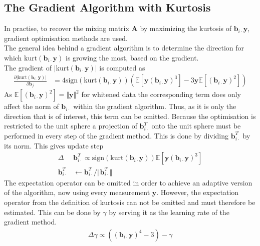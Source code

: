 \subsection{The Gradient Algorithm with Kurtosis}\label{sec:gra_kur}
In practise, to recover the mixing matrix $\textbf{A}$ by maximizing the kurtosis of $\textbf{b}_{i \cdot} \textbf{y}$, gradient optimisation methods are used.
\\
The general idea behind a gradient algorithm is to determine the direction for which $\text{kurt}(\textbf{b}_{i \cdot} \textbf{y})$ is growing the most, based on the gradient. 
\\
The gradient of $\vert \text{kurt}(\textbf{b}_{i \cdot} \textbf{y}) \vert$ is computed as
\begin{align}\label{eq:kurt}
\frac{\partial \vert \text{kurt}(\textbf{b}_{i \cdot} \textbf{y})\vert}{\partial \mathbf{b}_j} &= 4 \text{sign}(\text{kurt}(\textbf{b}_{i \cdot} \textbf{y})) (\mathbb{E}[\mathbf{y} (\textbf{b}_{i \cdot} \textbf{y})^3] - 3 \mathbf{y} \mathbb{E}[(\textbf{b}_{i \cdot} \textbf{y})^2]) 
\end{align} 
As $\mathbb{E}[(\textbf{b}_{i \cdot} \textbf{y})^2] =\Vert \mathbf{y} \Vert^2$ for whitened data the corresponding term does only affect the norm of $\textbf{b}_{i \cdot}$ within the gradient algorithm. 
Thus, as it is only the direction that is of interest, this term can be omitted. 
Because the optimisation is restricted to the unit sphere a projection of $\textbf{b}_{i \cdot}^T$ onto the unit sphere must be performed in every step of the gradient method. 
This is done by dividing $\textbf{b}_{i \cdot}^T$ by its norm. 
This gives update step 
\begin{align*}
\Delta &\textbf{b}_{i \cdot}^T \propto \text{sign}\left( \text{kurt}(\textbf{b}_{i \cdot} \textbf{y}) \right) \mathbb{E}[\textbf{y}(\textbf{b}_{i \cdot} \textbf{y})^3] \\
\textbf{b}_{i \cdot}^T &\leftarrow \textbf{b}_{i \cdot}^T/\Vert \textbf{b}_{i \cdot}^T \Vert
\end{align*}  
The expectation operator can be omitted in order to achieve an adaptive version of the algorithm, now using every measurement $\textbf{y}$. 
However, the expectation operator from the definition of kurtosis can not be omitted and must therefore be estimated. 
This can be done by $\gamma$ by serving it as the learning rate of the gradient method.
\begin{align*}
\Delta \gamma \propto((\textbf{b}_{i \cdot} \textbf{y})^4 - 3) - \gamma
\end{align*}

